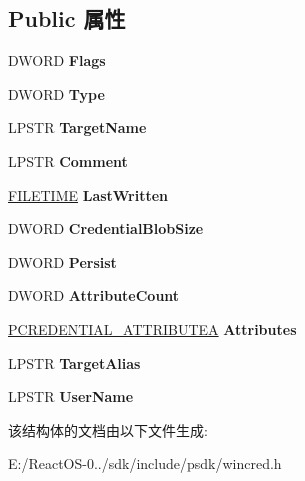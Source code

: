 \subsection*{Public 属性}
\begin{DoxyCompactItemize}
\item 
\mbox{\label{struct___c_r_e_d_e_n_t_i_a_l_a_af57b2fae547b376bb2afa3fa421b6a38}} 
D\+W\+O\+RD {\bfseries Flags}
\item 
\mbox{\label{struct___c_r_e_d_e_n_t_i_a_l_a_aec84a3fdc1fb0ca394b66f1ab656486a}} 
D\+W\+O\+RD {\bfseries Type}
\item 
\mbox{\label{struct___c_r_e_d_e_n_t_i_a_l_a_a9eb38d80a06cfe5418974babddee5ba1}} 
L\+P\+S\+TR {\bfseries Target\+Name}
\item 
\mbox{\label{struct___c_r_e_d_e_n_t_i_a_l_a_a5276950eb838b59a1b4f4f7e24c60b69}} 
L\+P\+S\+TR {\bfseries Comment}
\item 
\mbox{\label{struct___c_r_e_d_e_n_t_i_a_l_a_ac160a4a133c6f50850c52e965e696576}} 
\hyperlink{struct___f_i_l_e_t_i_m_e}{F\+I\+L\+E\+T\+I\+ME} {\bfseries Last\+Written}
\item 
\mbox{\label{struct___c_r_e_d_e_n_t_i_a_l_a_af40a17066a071c33740c1d3181c8bef0}} 
D\+W\+O\+RD {\bfseries Credential\+Blob\+Size}
\item 
\mbox{\label{struct___c_r_e_d_e_n_t_i_a_l_a_a8c20fed838f6f32686c3476ec92150bd}} 
D\+W\+O\+RD {\bfseries Persist}
\item 
\mbox{\label{struct___c_r_e_d_e_n_t_i_a_l_a_ae19ee88f61ca35428a43d2c3879ec082}} 
D\+W\+O\+RD {\bfseries Attribute\+Count}
\item 
\mbox{\label{struct___c_r_e_d_e_n_t_i_a_l_a_a4fa99b255854231140a7c1e4b63b993e}} 
\hyperlink{struct___c_r_e_d_e_n_t_i_a_l___a_t_t_r_i_b_u_t_e_a}{P\+C\+R\+E\+D\+E\+N\+T\+I\+A\+L\+\_\+\+A\+T\+T\+R\+I\+B\+U\+T\+EA} {\bfseries Attributes}
\item 
\mbox{\label{struct___c_r_e_d_e_n_t_i_a_l_a_a861c8d06c3113e15263d106eb02425f1}} 
L\+P\+S\+TR {\bfseries Target\+Alias}
\item 
\mbox{\label{struct___c_r_e_d_e_n_t_i_a_l_a_a8fdd29835e8e3c3db5da1cbd518f8154}} 
L\+P\+S\+TR {\bfseries User\+Name}
\end{DoxyCompactItemize}


该结构体的文档由以下文件生成\+:\begin{DoxyCompactItemize}
\item 
E\+:/\+React\+O\+S-\/0../sdk/include/psdk/wincred.\+h\end{DoxyCompactItemize}
